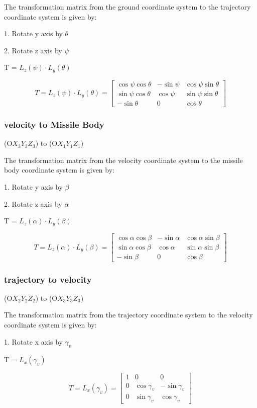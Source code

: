 \documentclass{article}
\begin{document}
The transformation matrix from the ground coordinate system to the trajectory coordinate system is given by:

1. Rotate y axis by \(\theta\)

2. Rotate z axis by \(\psi\)

T = \(L_z(\psi) \cdot L_y(\theta)\)

\[
T = L_z(\psi) \cdot L_y(\theta) =
\begin{bmatrix}
\cos \psi \cos \theta & -\sin \psi & \cos \psi \sin \theta \\
\sin \psi \cos \theta & \cos \psi & \sin \psi \sin \theta \\
-\sin \theta & 0 & \cos \theta
\end{bmatrix}
\]

\subsubsection{velocity to Missile Body}

(O\(X_3Y_3Z_3\)) to (O\(X_1Y_1Z_1\))

The transformation matrix from the velocity coordinate system to the missile body coordinate system is given by:

1. Rotate y axis by \(\beta\)

2. Rotate z axis by \(\alpha\)

T = \(L_z(\alpha) \cdot L_y(\beta)\)

\[
T = L_z(\alpha) \cdot L_y(\beta) =
\begin{bmatrix}
\cos \alpha \cos \beta & -\sin \alpha & \cos \alpha \sin \beta \\
\sin \alpha \cos \beta & \cos \alpha & \sin \alpha \sin \beta \\
-\sin \beta & 0 & \cos \beta
\end{bmatrix}
\]

\subsubsection{trajectory to velocity}

(O\(X_2Y_2Z_2\)) to (O\(X_3Y_3Z_3\))

The transformation matrix from the trajectory coordinate system to the velocity coordinate system is given by:

1. Rotate x axis by \(\gamma_v\)

T = \(L_x(\gamma_v)\)

\[
T = L_x(\gamma_v) =
\begin{bmatrix}
1 & 0 & 0 \\
0 & \cos \gamma_v & -\sin \gamma_v \\
0 & \sin \gamma_v & \cos \gamma_v
\end{bmatrix}
\]
\end{document}
